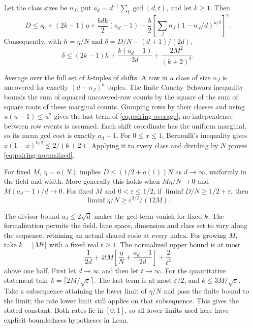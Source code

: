 \begin{corollary}\label{cor:pairing-average}
Let the class sizes be $n_J$, put $a_d=d^{-1}\sum_t\gcd(d,t)$,
and let $k\ge1$. Then
\begin{equation}\label{eq:pairing-average}
 D\le s_0+(2k-1)\eta+\frac{bdk}{2}(a_d-1)
       +\frac b2\left[\sum_Jn_J(1-n_J/d)^{k/2}\right]^2.
\end{equation}
Consequently, with $h=\eta/N$ and $\delta=D/N-(d+1)/(2d)$,
\begin{equation}\label{eq:pairing-normalized}
 \delta\le(2k-1)h+\frac{k(a_d-1)}{2d}+\frac{2M^2}{(k+2)^2}.
\end{equation}
\end{corollary}
\begin{outline}
Average over the full set of $k$-tuples of shifts. A row in a class of
size $n_J$ is uncovered for exactly $(d-n_J)^k$ tuples. The finite
Cauchy--Schwarz inequality bounds the sum of squared uncovered-row counts
by the square of the sum of square roots of these marginal counts.
Grouping rows by their classes and using $u(u-1)\le u^2$ gives the
last term of \eqref{eq:pairing-average}; no independence between row
events is assumed. Each shift coordinate has the uniform marginal, so
its mean gcd cost is exactly $a_d-1$.
For $0\le x\le1$, Bernoulli's inequality gives
$x(1-x)^{k/2}\le2/(k+2)$. Applying it to every class and dividing by
$N$ proves \eqref{eq:pairing-normalized}.
\end{outline}

\begin{corollary}\label{cor:pairing-loss}
For fixed $M$, $\eta=o(N)$ implies $D\le(1/2+o(1))N$ as $d\to\infty$,
uniformly in the field and width. More generally this holds when
$M\eta/N\to0$ and $M(a_d-1)/d\to0$. For fixed $M$ and
$0<\varepsilon\le1/2$, if $\liminf D/N\ge1/2+\varepsilon$, then
\[
 \liminf\eta/N\ge\varepsilon^{3/2}/(12M).
\]
\end{corollary}
\begin{outline}
The divisor bound $a_d\le2\sqrt d$ makes the gcd term vanish for fixed
$k$. The formalization permits the field, lane space, dimension and
class set to vary along the sequence, retaining an actual shared code
at every index. For growing $M$, take $k=\lceil Mt\rceil$ with a fixed
real $t\ge1$. The normalized upper bound is at most
\[
 \frac1{2d}+4tM\left[\frac\eta N+\frac{a_d-1}{2d}\right]+\frac2{t^2}
\]
above one half. First let $d\to\infty$ and then let $t\to\infty$.
For the quantitative statement take $k=\lceil2M/\sqrt\varepsilon\rceil$.
The last term is at most $\varepsilon/2$, and
$k\le3M/\sqrt\varepsilon$. Take a subsequence attaining the lower limit
of $\eta/N$ and pass the finite bound to the limit; the rate lower limit
still applies on that subsequence. This gives the stated constant.
Both rates lie in $[0,1]$, so all lower limits used here have explicit
boundedness hypotheses in Lean.
\end{outline}

